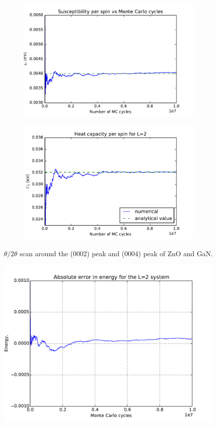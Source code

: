 	
	\begin{figure}[H]
		\begin{subfigure}[b]{0.49\textwidth}
	\includegraphics[width=1\linewidth]{../results/4b/L_2_susceptibility}
\caption{}
\label{fig:l2susceptibility}
		\end{subfigure}
		\hfill
		\begin{subfigure}[b]{0.49\textwidth}
		\includegraphics[width=1\linewidth]{../results/4b/L_2_heat_capasity}
\caption{}
\label{fig:l2heatcapasity}
		\end{subfigure}
		\caption{$\theta/2\theta$ scan around the (0002) peak and (0004) peak of ZnO and GaN.}
	\end{figure}

\begin{figure}[H]
	\centering
	\includegraphics[width=0.7\linewidth]{../results/4b/abs_error}
	\caption{}
	\label{fig:abserror}
\end{figure}

